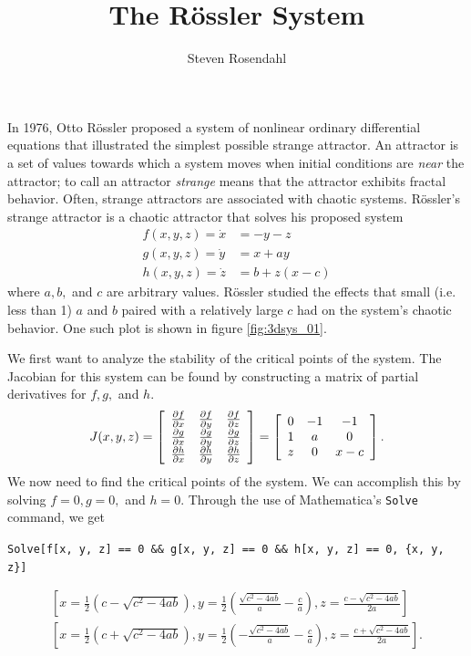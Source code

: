 \documentclass{article}
\title{The R\"{o}ssler System}
\author{Steven Rosendahl}
\date{}
\begin{document}
\maketitle

In 1976, Otto R\"{o}ssler proposed a system of nonlinear ordinary differential equations that illustrated the simplest possible strange attractor. An attractor is a set of values towards which a system moves when initial conditions are \textit{near} the attractor; to call an attractor \textit{strange} means that the attractor exhibits fractal behavior. Often, strange attractors are associated with chaotic systems. R\"{o}ssler's strange attractor is a chaotic attractor that solves his proposed system
\begin{align}
	f(x,y,z) = \dot{x} & = -y-z     \\
	g(x,y,z) = \dot{y} & = x+ay     \\
	h(x,y,z) = \dot{z} & = b+z(x-c)
\end{align}
where $a,b,$ and $c$ are arbitrary values. R\"{o}ssler studied the effects that small (i.e. less than 1) $a$ and $b$ paired with a relatively large $c$ had on the system's chaotic behavior. One such plot is shown in figure \ref{fig:3dsys_01}.

We first want to analyze the stability of the critical points of the system. The Jacobian for this system can be found by constructing a matrix of partial derivatives for $f,g,$ and $h$.
\[
	J(x,y,z)=
	\left[
	\begin{array}{c c c}
		\frac{\partial f}{\partial x} & \frac{\partial f}{\partial y} & \frac{\partial f}{\partial z} \\
		\frac{\partial g}{\partial x} & \frac{\partial g}{\partial y} & \frac{\partial g}{\partial z} \\
		\frac{\partial h}{\partial x} & \frac{\partial h}{\partial y} & \frac{\partial h}{\partial z} \\
	\end{array}
	\right]
	=
	\left[
	\begin{array}{c c c}
		0 & -1 & -1  \\
		1 & a  & 0   \\
		z & 0  & x-c
	\end{array}
	\right].
\]
We now need to find the critical points of the system. We can accomplish this by solving $f=0,g=0,$ and $h=0$. Through the use of Mathematica's \texttt{Solve} command, we get
\begin{center}
	\texttt{Solve[f[x, y, z] == 0 \&\& g[x, y, z] == 0 \&\& h[x, y, z] == 0, \{x, y, z\}]}
\end{center}
\begin{gather}
	\left[
	x=\frac{1}{2}\left(c-\sqrt{c^{2}-4ab}\right),
	y=\frac{1}{2}\left(\frac{\sqrt{c^{2}-4ab}}{a}-\frac{c}{a}\right),
	z=\frac{c-\sqrt{c^{2}-4ab}}{2a}
	\right]\label{eq:csln1}\\
	\left[
	x=\frac{1}{2}\left(c+\sqrt{c^{2}-4ab}\right),
	y=\frac{1}{2}\left(-\frac{\sqrt{c^{2}-4ab}}{a}-\frac{c}{a}\right),
	z=\frac{c+\sqrt{c^{2}-4ab}}{2a}
	\right]\label{eq:csln2}.
\end{gather}
\end{document}
